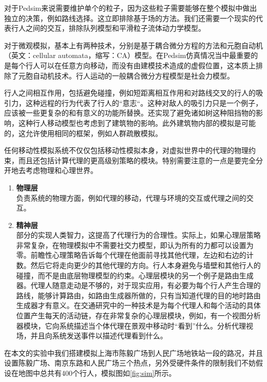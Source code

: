 对于Pedsim来说需要维护单个的粒子，因为这些粒子需要能够在整个模拟中做出独立的决策，例如路线选择。这立即排除基于场的方法。我们还需要一个现实的代表行人之间的交互，排除队列模型和平滑粒子流体动力学模型。

对于微观模拟，基本上有两种技术，分别是基于耦合微分方程的方法和元胞自动机（英文：cellular automata，缩写：CA）模型。在Pedsim仿真情况当中最重要的是每个行人可以在任意方向移动，而没有由建模技术造成的虚假位置，这本质上排除了元胞自动机技术。行人运动的一般耦合微分方程模型是社会力模型。

行人之间相互作用，包括避免碰撞，例如短距离相互作用和对路线交叉的行人的吸引力，这种远程的行为代表了行人的“意志“。这种对敌人的吸引力只是一个例子，应该被一些更复杂的和有意义的功能所替换。还实现了避免诸如树这种阻挡物的影响，这种行人移动模型也考虑到了建筑物的影响。此外建筑物内部的模拟是可能的，这允许使用相同的框架，例如人群疏散模拟。

任何移动性模拟系统不仅仅包括移动性模拟本身，对虚拟世界中的代理的物理约束，而且还包括计算代理的更高级别策略的模块。特别需要注意的一点是要完全分开地去考虑物理和心理世界。

\begin{enumerate}
    \item \textbf{物理层} \\ 负责系统的物理方面，例如代理的移动，代理与环境的交互或代理之间的交互。
    \item \textbf{精神层} \\ 部分的实现人类智力，这提高了代理行为的合理性。实际上，如果心理层策略非常复杂，在物理模拟中不需要社交力模型，即认为所有的力都可以设置为零。前瞻性心理策略告诉每个代理在他面前寻找其他代理，左边和右边的计数。然后它将走向更少的其他代理的方向。行人本身避免与墙壁和其他行人的碰撞，而不是由底层物理模型的约束。心理层模块的另一个例子是路由生成器。代理人随意走动是不够的，对于现实应用，有必要为每个行人产生合理的路线，能够计算路由，如路由生成器所做的，只有当知道代理的目的地时路由生成器才有意义。在交通研究中的一种技术是为每个代理人和每个活动的具体位置产生每天的活动链，存在非常复杂的心理层模块，例如，有一个视图分析器模块，它向系统描述当个体代理在景观中移动时“看到”什么。分析代理视场，并且向系统发送事件以描述代理看到什么。
\end{enumerate}

在本文的实验中我们搭建模拟上海市陈毅广场到人民广场地铁站一段的路况，并且设置陈毅广场、南京东路和人民广场三个热点，另外受硬件条件的限制我们不妨假设在地图中总共有400个行人，模拟图如\ref{fig:sim}所示。

